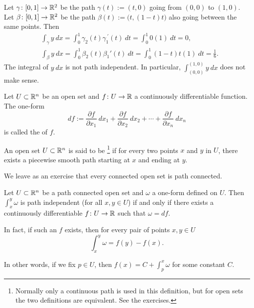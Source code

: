 \begin{example}
Let $\gamma \colon [0,1] \to {\mathbb{R}}^2$ be the path $\gamma(t) := (t,0)$
going from $(0,0)$ to $(1,0)$.  Let $\beta \colon [0,1] \to {\mathbb{R}}^2$ be the path
$\beta(t) := \bigl(t,(1-t)t\bigr)$ also going between the same points.  Then
\begin{align*}
& \int_\gamma y ~ dx = 
\int_0^1 \gamma_2(t) \gamma_1^{\:\prime}(t) ~ dt
=
\int_0^1 0 (1) ~ dt = 0 ,\\
& \int_\beta y ~ dx = 
\int_0^1 \beta_2(t) \beta_1'(t) ~ dt
=
\int_0^1 (1-t)t(1) ~ dt = \frac{1}{6} .
\end{align*}
The integral of $y~dx$ is not path independent.
In particular,
$\int_{(0,0)}^{(1,0)} y~dx$ does not make sense.
\end{example}

\begin{defn}
Let $U \subset {\mathbb{R}}^n$ be an open set and $f \colon U \to {\mathbb{R}}$ a 
continuously differentiable function.  The one-form
\begin{equation*}
df :=
\frac{\partial f}{\partial x_1} ~ dx_1 + 
\frac{\partial f}{\partial x_2} ~ dx_2 + \cdots +
\frac{\partial f}{\partial x_n} ~ dx_n 
\end{equation*}
is called the \emph{} of $f$.

An open set $U \subset {\mathbb{R}}^n$ is said to be \emph{}%
\footnote{Normally only a continuous path is used in this definition, but
for open sets the two definitions are equivalent.  See the exercises.}
if for every two points $x$ and $y$ in $U$, there exists a piecewise smooth
path starting at $x$ and ending at $y$.
\end{defn}

We leave as an exercise that every connected open set is path
connected.

\begin{prop} \label{mv:prop:pathinddf}
Let $U \subset {\mathbb{R}}^n$ be a path connected open set and $\omega$ a one-form
defined on $U$.  Then
$\int_x^y \omega$
is path independent (for all $x,y \in U$) if and only if there exists
a continuously differentiable $f \colon U \to {\mathbb{R}}$ such that $\omega = df$.

In fact, if such an $f$ exists, then for every pair of points $x,y \in U$
\begin{equation*}
\int_{x}^y \omega = f(y)-f(x) .
\end{equation*}
\end{prop}

In other words, if we fix $p \in U$, then $f(x) = C + \int_{p}^x \omega$
for some constant $C$.

